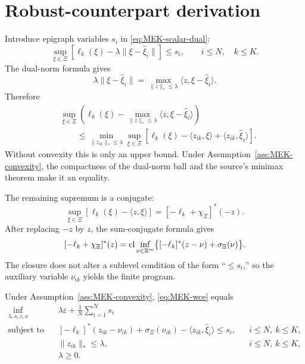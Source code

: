 \section{Robust-counterpart derivation}
Introduce epigraph variables $s_i$ in \eqref{eq:MEK-scalar-dual}:
\begin{equation}\label{eq:MEK-semi-infinite}
 \sup_{\xi\in\Xi}
 [\ell_k(\xi)-\lambda\|\xi-\widehat\xi_i\|]
 \le s_i,
 \qquad i\le N,
 \quad k\le K.
\end{equation}
The dual-norm formula gives
\[
 \lambda\|\xi-\widehat\xi_i\|
 =\max_{\|z\|_*\le\lambda}
 \langle z,\xi-\widehat\xi_i\rangle.
\]
Therefore
\begin{align*}
 &\sup_{\xi\in\Xi}
 \left(\ell_k(\xi)-
 \max_{\|z\|_*\le\lambda}
 \langle z,\xi-\widehat\xi_i\rangle\right)\\
 &\qquad\le
 \min_{\|z_{ik}\|_*\le\lambda}
 \sup_{\xi\in\Xi}
 [\ell_k(\xi)-\langle z_{ik},\xi\rangle
 +\langle z_{ik},\widehat\xi_i\rangle].
\end{align*}
Without convexity this is only an upper bound.  Under Assumption~\ref{ass:MEK-convexity}, the compactness of the dual-norm ball and the source's minimax theorem make it an equality.

The remaining supremum is a conjugate:
\[
 \sup_{\xi\in\Xi}[\ell_k(\xi)-\langle z,\xi\rangle]
 =[-\ell_k+\chi_\Xi]^*(-z).
\]
After replacing $-z$ by $z$, the sum-conjugate formula gives
\begin{equation}\label{eq:MEK-inf-conv}
 [-\ell_k+\chi_\Xi]^*(z)
 =\operatorname{cl}\inf_{\nu\in\mathbb{R}^m}
 \bigl\{[-\ell_k]^*(z-\nu)+\sigma_\Xi(\nu)\bigr\}.
\end{equation}
The closure does not alter a sublevel condition of the form ``$\le s_i$,'' so the auxiliary variable $\nu_{ik}$ yields the finite program.

\begin{theorem}\label{thm:MEK-convex-reduction}
Under Assumption~\ref{ass:MEK-convexity}, \eqref{eq:MEK-wce} equals
\begin{equation}\label{eq:MEK-finite-program}
\begin{aligned}
 \inf_{\lambda,s,z,\nu}\quad
 &\lambda\varepsilon+\frac1N\sum_{i=1}^Ns_i\\
 \text{subject to}\quad
 &[-\ell_k]^*(z_{ik}-\nu_{ik})
 +\sigma_\Xi(\nu_{ik})
 -\langle z_{ik},\widehat\xi_i\rangle
 \le s_i,
 &&i\le N,\ k\le K,\\
 &\|z_{ik}\|_*\le\lambda,
 &&i\le N,\ k\le K,\\
 &\lambda\ge0.
\end{aligned}
\end{equation}
\end{theorem}

